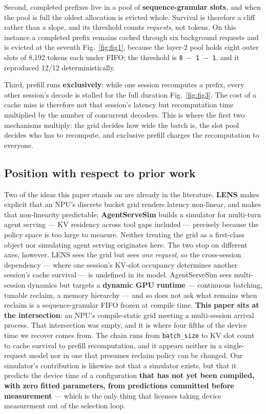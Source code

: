 Second, completed prefixes live in a pool of \textbf{sequence-granular slots}, and when the pool is full the oldest allocation is evicted whole. Survival is therefore a cliff rather than a slope, and its threshold counts \emph{requests}, not tokens. On this instance a completed prefix remains cached through six background requests and is evicted at the seventh Fig.~\ref{fig:fig1}, because the layer-2 pool holds eight outer slots of 8,192 tokens each under FIFO; the threshold is \texttt{8 $-$ 1 $-$ 1}, and it reproduced 12/12 deterministically.

Third, prefill runs \textbf{exclusively}: while one session recomputes a prefix, every other session's decode is stalled for the full duration Fig.~\ref{fig:fig3}. The cost of a cache miss is therefore not that session's latency but recomputation time multiplied by the number of concurrent decoders. This is where the first two mechanisms multiply: the grid decides how wide the batch is, the slot pool decides who has to recompute, and exclusive prefill charges the recomputation to everyone.


\subsection{Position with respect to prior work}

Two of the ideas this paper stands on are already in the literature. \textbf{LENS} \cite{lens2026} makes explicit that an NPU's discrete bucket grid renders latency non-linear, and makes that non-linearity predictable; \textbf{AgentServeSim} \cite{agentservesim2026} builds a simulator for multi-turn agent serving --- KV residency across tool gaps included --- precisely because the policy space is too large to measure. Neither treating the grid as a first-class object nor simulating agent serving originates here. The two stop on different axes, however. LENS sees the grid but sees \emph{one request}, so the cross-session dependency --- where one session's KV-slot occupancy determines another session's cache survival --- is undefined in its model. AgentServeSim sees multi-session dynamics but targets a \textbf{dynamic GPU runtime} --- continuous batching, tunable reclaim, a memory hierarchy --- and so does not ask what remains when reclaim is a sequence-granular FIFO frozen at compile time. \textbf{This paper sits at the intersection}: an NPU's compile-static grid meeting a multi-session arrival process. That intersection was empty, and it is where four fifths of the device time we recover comes from. The chain runs from \texttt{batch\_size} to KV slot count to cache survival to prefill recomputation, and it appears neither in a single-request model nor in one that presumes reclaim policy can be changed. Our simulator's contribution is likewise not that a simulator exists, but that it predicts the device time of a configuration \textbf{that has not yet been compiled, with zero fitted parameters, from predictions committed before measurement} --- which is the only thing that licenses taking device measurement out of the selection loop.


